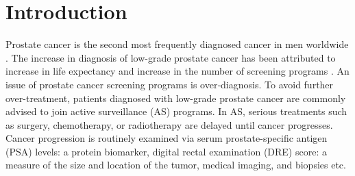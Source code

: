 
\section{Introduction}
\label{sec:introduction}
Prostate cancer is the second most frequently diagnosed cancer in men worldwide \cite{GlobalCancerStats2012}. The increase in diagnosis of low-grade prostate cancer has been attributed to increase in life expectancy and increase in the number of screening programs \cite{potoskyPSAcancer}. An issue of prostate cancer screening programs is over‐diagnosis. To avoid further over-treatment, patients diagnosed with low-grade prostate cancer are commonly advised to join active surveillance (AS) programs. In AS, serious treatments such as surgery, chemotherapy, or radiotherapy are delayed until cancer progresses. Cancer progression is routinely examined via serum prostate-specific antigen (PSA) levels: a protein biomarker, digital rectal examination (DRE) score: a measure of the size and location of the tumor, medical imaging, and biopsies etc.

